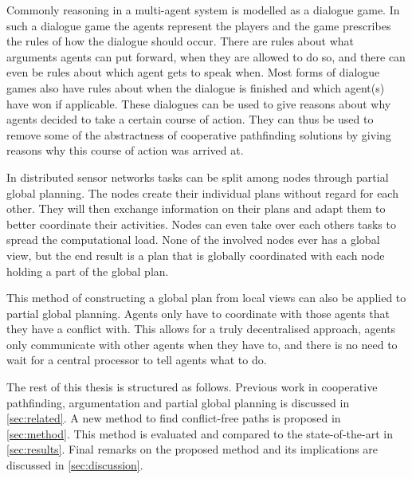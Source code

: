 Commonly reasoning in a multi-agent system is modelled as a dialogue game. In
such a dialogue game the agents represent the players and the game prescribes
the rules of how the dialogue should occur. There are rules about what
arguments agents can put forward, when they are allowed to do so, and there can
even be rules about which agent gets to speak when. Most forms of dialogue
games also have rules about when the dialogue is finished and which agent(s)
have won if applicable. These dialogues can be used to give reasons about why
agents decided to take a certain course of action. They can thus be used to
remove some of the abstractness of cooperative pathfinding solutions by giving
reasons why this course of action was arrived at.

In distributed sensor networks tasks can be split among nodes through partial
global planning. The nodes create their individual plans without regard for
each other. They will then exchange information on their plans and adapt them
to better coordinate their activities. Nodes can even take over each others
tasks to spread the computational load. None of the involved nodes ever has a
global view, but the end result is a plan that is globally coordinated with
each node holding a part of the global plan.

This method of constructing a global plan from local views can also be applied
to partial global planning. Agents only have to coordinate with those agents
that they have a conflict with. This allows for a truly decentralised approach,
agents only communicate with other agents when they have to, and there is no
need to wait for a central processor to tell agents what to do.


The rest of this thesis is structured as follows. Previous work in cooperative
pathfinding, argumentation and partial global planning is discussed in
\autoref{sec:related}. A new method to find conflict-free paths is proposed in
\autoref{sec:method}. This method is evaluated and compared to the
state-of-the-art in \autoref{sec:results}. Final remarks on the proposed method
and its implications are discussed in \autoref{sec:discussion}.
